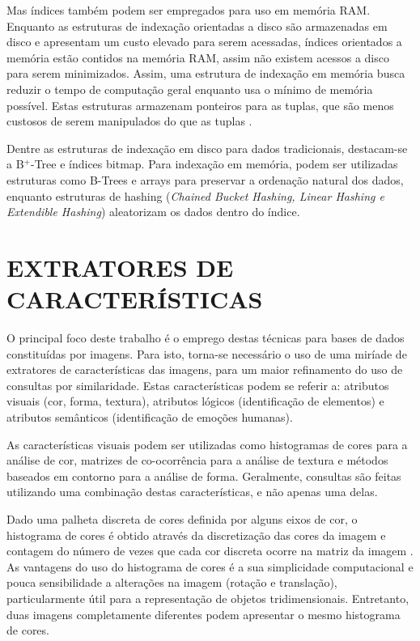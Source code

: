Mas índices também podem ser empregados para uso em memória RAM. Enquanto as estruturas de indexação orientadas a disco são armazenadas em disco e apresentam
um custo elevado para serem acessadas, índices orientados a memória estão contidos na memória RAM, assim não existem acessos
a disco para serem minimizados. Assim, uma estrutura de indexação em memória busca reduzir o tempo de computação geral enquanto usa
o mínimo de memória possível. Estas estruturas armazenam ponteiros para as tuplas, que são menos custosos de serem manipulados do que as tuplas \cite{Lehman1986}.\par
				
Dentre as estruturas de indexação em disco para dados tradicionais, destacam-se a B$^{+}$-Tree e índices bitmap. Para indexação em memória,
podem ser utilizadas estruturas como B-Trees e arrays para preservar a ordenação natural dos dados, enquanto estruturas de hashing
(\textit{Chained Bucket Hashing, Linear Hashing e Extendible Hashing}) aleatorizam os dados dentro do índice.

\section{EXTRATORES DE CARACTERÍSTICAS}
\label{sec:extcarac}
O principal foco deste trabalho é o emprego destas técnicas para bases de dados constituídas por imagens. Para isto, torna-se necessário o uso de uma miríade de extratores de características
das imagens, para um maior refinamento do uso de consultas por similaridade. Estas características podem se referir a: atributos visuais (cor, forma, textura), atributos lógicos (identificação
de elementos) e atributos semânticos (identificação de emoções humanas).\par

As características visuais podem ser utilizadas como histogramas de cores para a análise de cor, matrizes de co-ocorrência para a análise de textura e
métodos baseados em contorno para a análise de forma. Geralmente, consultas são feitas utilizando uma combinação destas características, e não apenas uma delas.\par

Dado uma palheta discreta de cores definida por alguns eixos de cor, o histograma de cores é obtido através da discretização das cores da imagem e contagem
do número de vezes que cada cor discreta ocorre na matriz da imagem \cite{Swain1991}. As vantagens do uso do histograma de cores é a sua simplicidade computacional e pouca
sensibilidade a alterações na imagem (rotação e translação), particularmente útil para a representação de objetos tridimensionais. Entretanto, duas imagens completamente 
diferentes podem apresentar o mesmo histograma de cores.\par


